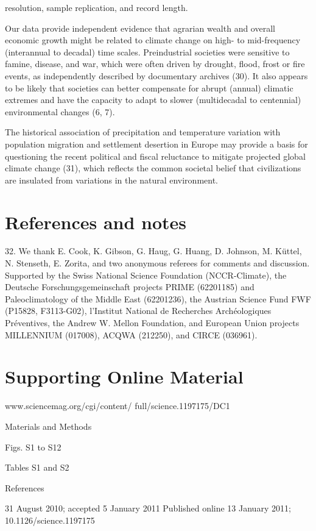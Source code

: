\documentclass[10pt,a4paper,twoside,onecolumn]{article}
\begin{document}
\begin{myfont}
\begin{multicols}{3}
resolution, sample replication, and record length. \par
Our data provide independent evidence that agrarian wealth and overall economic growth might be related to climate change on high- to mid-frequency (interannual to decadal) time scales. Preindustrial societies were sensitive to famine, disease, and war, which were often driven by drought, flood, frost or fire events, as independently described by documentary archives (30). It also appears to be likely that societies can better compensate for abrupt (annual) climatic extremes and have the capacity to adapt to slower (multidecadal to centennial) environmental changes (6, 7). \par
The historical association of precipitation and temperature variation with population migration and settlement desertion in Europe may provide a basis for questioning the recent political and fiscal reluctance to mitigate projected global climate change (31), which reflects the common societal belief that civilizations are insulated from variations in the natural environment.

\section*{References and notes}




32. We thank E. Cook, K. Gibson, G. Haug, G. Huang,
D. Johnson, M. Küttel, N. Stenseth, E. Zorita, and two
anonymous referees for comments and discussion.
Supported by the Swiss National Science Foundation
(NCCR-Climate), the Deutsche Forschungsgemeinschaft
projects PRIME (62201185) and Paleoclimatology of
the Middle East (62201236), the Austrian Science
Fund FWF (P15828, F3113-G02), l’Institut National
de Recherches Archéologiques Préventives, the
Andrew W. Mellon Foundation, and European Union
projects MILLENNIUM (017008), ACQWA (212250),
and CIRCE (036961).

\section*{\textbf{Supporting Online Material}}
www.sciencemag.org/cgi/content/ full/science.1197175/DC1 

Materials and Methods

Figs. S1 to S12

Tables S1 and S2

References

31 August 2010; accepted 5 January 2011 Published online 13 January 2011; 10.1126/science.1197175
	
	
	
	
	
	
	
	
\end{multicols}	
\end{myfont}	
\end{document}
